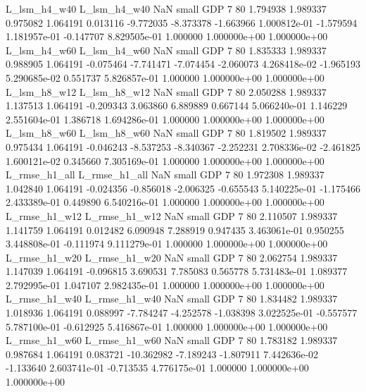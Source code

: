  L_lsm_h4_w40   L_lsm_h4_w40                   NaN      small      GDP                 7 80 1.794938       1.989337 0.975082       1.064191    0.013116     -9.772035     -8.373378    -1.663966   1.000812e-01 -1.579594 1.181957e-01    -0.147707   8.829505e-01            1.000000    1.000000e+00        1.000000e+00
  L_lsm_h4_w60   L_lsm_h4_w60                   NaN      small      GDP                 7 80 1.835333       1.989337 0.988905       1.064191   -0.075464     -7.741471     -7.074454    -2.060073   4.268418e-02 -1.965193 5.290685e-02     0.551737   5.826857e-01            1.000000    1.000000e+00        1.000000e+00
  L_lsm_h8_w12   L_lsm_h8_w12                   NaN      small      GDP                 7 80 2.050288       1.989337 1.137513       1.064191   -0.209343      3.063860      6.889889     0.667144   5.066240e-01  1.146229 2.551604e-01     1.386718   1.694286e-01            1.000000    1.000000e+00        1.000000e+00
  L_lsm_h8_w60   L_lsm_h8_w60                   NaN      small      GDP                 7 80 1.819502       1.989337 0.975434       1.064191   -0.046243     -8.537253     -8.340367    -2.252231   2.708336e-02 -2.461825 1.600121e-02     0.345660   7.305169e-01            1.000000    1.000000e+00        1.000000e+00
 L_rmse_h1_all  L_rmse_h1_all                   NaN      small      GDP                 7 80 1.972308       1.989337 1.042840       1.064191   -0.024356     -0.856018     -2.006325    -0.655543   5.140225e-01 -1.175466 2.433389e-01     0.449890   6.540216e-01            1.000000    1.000000e+00        1.000000e+00
 L_rmse_h1_w12  L_rmse_h1_w12                   NaN      small      GDP                 7 80 2.110507       1.989337 1.141759       1.064191    0.012482      6.090948      7.288919     0.947435   3.463061e-01  0.950255 3.448808e-01    -0.111974   9.111279e-01            1.000000    1.000000e+00        1.000000e+00
 L_rmse_h1_w20  L_rmse_h1_w20                   NaN      small      GDP                 7 80 2.062754       1.989337 1.147039       1.064191   -0.096815      3.690531      7.785083     0.565778   5.731483e-01  1.089377 2.792995e-01     1.047107   2.982435e-01            1.000000    1.000000e+00        1.000000e+00
 L_rmse_h1_w40  L_rmse_h1_w40                   NaN      small      GDP                 7 80 1.834482       1.989337 1.018936       1.064191    0.088997     -7.784247     -4.252578    -1.038398   3.022525e-01 -0.557577 5.787100e-01    -0.612925   5.416867e-01            1.000000    1.000000e+00        1.000000e+00
 L_rmse_h1_w60  L_rmse_h1_w60                   NaN      small      GDP                 7 80 1.783182       1.989337 0.987684       1.064191    0.083721    -10.362982     -7.189243    -1.807911   7.442636e-02 -1.133640 2.603741e-01    -0.713535   4.776175e-01            1.000000    1.000000e+00        1.000000e+00
